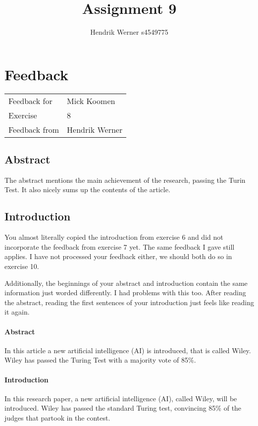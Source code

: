 \documentclass[12pt, a4paper]{article}
\title{Assignment 9}
\author{Hendrik Werner s4549775}
\begin{document}
\maketitle

\clearpage
\section{Feedback}

\begin{tabular}{ll}
	Feedback for & Mick Koomen\\
	Exercise & 8\\
	Feedback from & Hendrik Werner\\
\end{tabular}

\subsection{Abstract}
The abstract mentions the main achievement of the research, passing the Turin Test. It also nicely sums up the contents of the article.

\subsection{Introduction}
You almost literally copied the introduction from exercise 6 and did not incorporate the feedback from exercise 7 yet. The same feedback I gave still applies. I have not processed your feedback either, we should both do so in exercise 10.

Additionally, the beginnings of your abstract and introduction contain the same information just worded differently. I had problems with this too. After reading the abstract, reading the first sentences of your introduction just feels like reading it again.

\begin{multicols}{2}
	\paragraph{Abstract} In this article a new artificial intelligence (AI) is introduced, that is called Wiley. Wiley has passed the Turing Test with a majority vote of 85\%.

	\paragraph{Introduction} In this research paper, a new artificial intelligence (AI), called Wiley, will be
introduced. Wiley has passed the standard Turing test, convincing 85\% of the
judges that partook in the contest.
\end{multicols}
\end{document}
